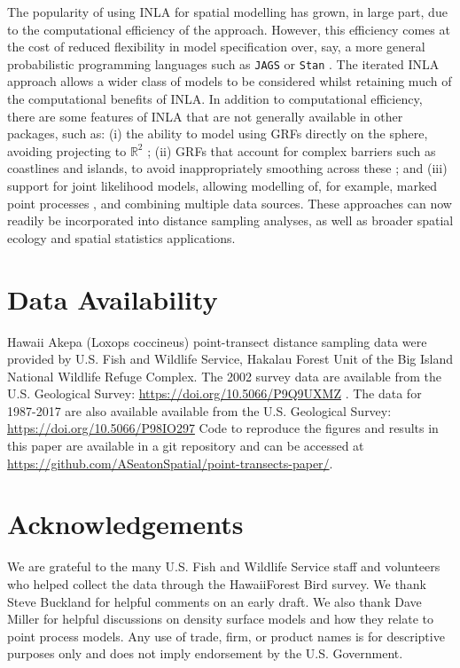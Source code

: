 \documentclass{statsoc}
\newcommand{\hawaii}{Hawai\textquotesingle i}   %
\begin{document}
The popularity of using INLA for spatial modelling has grown, in large part, due to the computational efficiency of the approach.  However, this efficiency comes at the cost of reduced flexibility in model specification over, say, a more general probabilistic programming languages such as \texttt{JAGS} \citep{plummer_jags_2017} or \texttt{Stan} \citep{stan_Rstan_2020}.  The iterated INLA approach allows a wider class of models to be considered whilst retaining much of the computational benefits of INLA.  In addition to computational efficiency, there are some features of INLA that are not generally available in other packages, such as: (i) the ability to model using GRFs directly on the sphere, avoiding projecting to $\mathbb{R}^2$ \citep{lindgren_explicit_2011}; (ii) GRFs that account for complex barriers such as coastlines and islands, to avoid inappropriately smoothing across these \citep{bakka_NonstationaryGaussianModels_2019}; and (iii) support for joint likelihood models, allowing modelling of, for example, marked point processes \citep{illian_FittingComplexEcological_2013}, and combining multiple data sources.  These approaches can now readily be incorporated into distance sampling analyses, as well as broader spatial ecology and spatial statistics applications. 

\section*{Data Availability} 

Hawaii Akepa (Loxops coccineus) point-transect distance sampling data were provided by U.S. Fish and Wildlife Service, Hakalau Forest Unit of the Big Island National Wildlife Refuge Complex. The 2002 survey data are available from the U.S. Geological Survey: \url{https://doi.org/10.5066/P9Q9UXMZ} \citep{camp_datarelease_2002}.  The data for 1987-2017 are also available  available from the U.S. Geological Survey: \url{https://doi.org/10.5066/P98IO297} \citep{camp_datarelease_all} Code to reproduce the figures and results in this paper are available in a git repository and can be accessed at \url{https://github.com/ASeatonSpatial/point-transects-paper/}.

\section*{Acknowledgements}

We are grateful to the many U.S. Fish and Wildlife Service staff and volunteers who helped collect the data through the \hawaii Forest Bird survey. We thank Steve Buckland for helpful comments on an early draft.  We also thank Dave Miller for helpful discussions on density surface models and how they relate to point process models.  Any use of trade, firm, or product names is for descriptive purposes only and does not imply endorsement by the U.S. Government.

\clearpage


\end{document}
